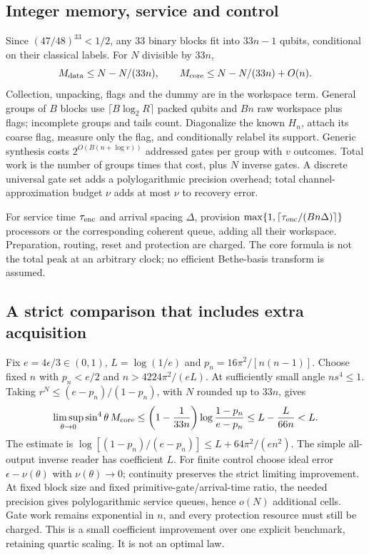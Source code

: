 \subsection{Integer memory, service and control}
Since $(47/48)^{33}<1/2$, any 33 binary blocks fit into $33n-1$ qubits,
conditional on their classical labels. For $N$ divisible by $33n$,
\[
 M_{\rm data}\le N-N/(33n),\qquad
 M_{\rm core}\le N-N/(33n)+O(n).
\]
Collection, unpacking, flags and the dummy are in the workspace term.
General groups of $B$ blocks use $\lceil B\log_2R\rceil$ packed qubits
and $Bn$ raw workspace plus flags; incomplete groups and tails count.
Diagonalize the known $H_n$, attach its coarse flag, measure only the flag,
and conditionally relabel its support. Generic synthesis costs
$2^{O(B(n+\log v))}$ addressed gates per group with $v$ outcomes.
Total work is the number of groups times that cost, plus $N$ inverse gates.
A discrete universal gate set adds a polylogarithmic precision overhead;
total channel-approximation budget $\nu$ adds at most $\nu$ to recovery error.

For service time $\tau_{\rm enc}$ and arrival spacing $\Delta$, provision
$\max\{1,\lceil\tau_{\rm enc}/(Bn\Delta)\rceil\}$ processors or the
corresponding coherent queue, adding all their workspace. Preparation,
routing, reset and protection are charged. The core formula is not the
total peak at an arbitrary clock; no efficient Bethe-basis transform is assumed.

\subsection{A strict comparison that includes extra acquisition}
Fix $e=4\epsilon/3\in(0,1)$, $L=\log(1/e)$ and
$p_n=16\pi^2/[n(n-1)]$. Choose fixed $n$ with $p_n<e/2$ and
$n>4224\pi^2/(eL)$. At sufficiently small angle $ns^4\le1$.
Taking $r^N\le(e-p_n)/(1-p_n)$, with $N$ rounded up to $33n$, gives
\[
 \limsup_{\theta\to0}\sin^4\theta\,M_{\rm core}
 \le\left(1-\frac1{33n}\right)\log\frac{1-p_n}{e-p_n}
 \le L-\frac{L}{66n}<L.
\]
The estimate is $\log[(1-p_n)/(e-p_n)]\le L+64\pi^2/(en^2)$.
The simple all-output inverse reader has coefficient $L$.
For finite control choose ideal error $\epsilon-\nu(\theta)$ with
$\nu(\theta)\to0$; continuity preserves the strict limiting improvement.
At fixed block size and fixed primitive-gate/arrival-time ratio, the needed
precision gives polylogarithmic service queues, hence $o(N)$ additional
cells. Gate work remains exponential in $n$, and every protection resource
must still be charged. This is a small coefficient improvement over one
explicit benchmark, retaining quartic scaling. It is not an optimal law.
